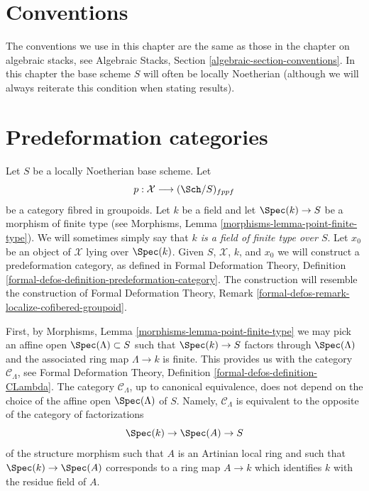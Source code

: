 \section{Conventions}
\label{artin-section-conventions}
The conventions we use in this chapter are the same as those in the
chapter on algebraic stacks, see
Algebraic Stacks, Section \ref{algebraic-section-conventions}.
In this chapter the base scheme $S$ will often be locally Noetherian
(although we will always reiterate this condition when stating
results).

\section{Predeformation categories}
\label{artin-section-predeformation-categories}
Let $S$ be a locally Noetherian base scheme. Let
$$
p : \mathcal{X} \longrightarrow (\Sch/S)_{fppf}
$$
be a category fibred in groupoids. Let $k$ be a field
and let $\Spec(k) \to S$ be a morphism of finite type (see
Morphisms, Lemma \ref{morphisms-lemma-point-finite-type}). We will sometimes
simply say that {\it $k$ is a field of finite type over $S$}. Let
$x_0$ be an object of $\mathcal{X}$ lying over $\Spec(k)$.
Given $S$, $\mathcal{X}$, $k$, and $x_0$ we will construct a
predeformation category, as defined in
Formal Deformation Theory,
Definition \ref{formal-defos-definition-predeformation-category}.
The construction will resemble the construction of
Formal Deformation Theory,
Remark \ref{formal-defos-remark-localize-cofibered-groupoid}.

\medskip\noindent
First, by Morphisms, Lemma \ref{morphisms-lemma-point-finite-type}
we may pick an affine open $\Spec(\Lambda) \subset S$ such that
$\Spec(k) \to S$ factors through $\Spec(\Lambda)$ and the associated
ring map $\Lambda \to k$ is finite. This provides us with the category
$\mathcal{C}_\Lambda$, see
Formal Deformation Theory, Definition \ref{formal-defos-definition-CLambda}.
The category $\mathcal{C}_\Lambda$, up to canonical equivalence,
does not depend on the choice of the affine open $\Spec(\Lambda)$ of $S$.
Namely, $\mathcal{C}_\Lambda$ is equivalent to the opposite
of the category of factorizations
\begin{equation}
\label{equation-factor}
\Spec(k) \to \Spec(A) \to S
\end{equation}
of the structure morphism such that $A$ is an Artinian local ring and
such that $\Spec(k) \to \Spec(A)$ corresponds to a ring map $A \to k$ which
identifies $k$ with the residue field of $A$.

